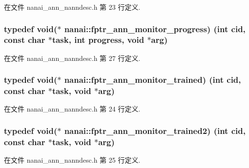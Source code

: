 在文件 nanai\+\_\+ann\+\_\+nanndesc.\+h 第 23 行定义.

\hypertarget{namespacenanai_a5c9964edbd4db8ae35df7cd024020e87}{}
\subsubsection[{fptr\+\_\+ann\+\_\+monitor\+\_\+progress}]{\setlength{\rightskip}{0pt plus 5cm}typedef void($\ast$ nanai\+::fptr\+\_\+ann\+\_\+monitor\+\_\+progress) (int cid, const char $\ast$task, int progress, void $\ast$arg)}\label{namespacenanai_a5c9964edbd4db8ae35df7cd024020e87}


在文件 nanai\+\_\+ann\+\_\+nanndesc.\+h 第 27 行定义.

\hypertarget{namespacenanai_adb209ab120b98e800db2b0c8621cd488}{}
\subsubsection[{fptr\+\_\+ann\+\_\+monitor\+\_\+trained}]{\setlength{\rightskip}{0pt plus 5cm}typedef void($\ast$ nanai\+::fptr\+\_\+ann\+\_\+monitor\+\_\+trained) (int cid, const char $\ast$task, void $\ast$arg)}\label{namespacenanai_adb209ab120b98e800db2b0c8621cd488}


在文件 nanai\+\_\+ann\+\_\+nanndesc.\+h 第 24 行定义.

\hypertarget{namespacenanai_a598e872bf861dac8080e98d6d155b3b5}{}
\subsubsection[{fptr\+\_\+ann\+\_\+monitor\+\_\+trained2}]{\setlength{\rightskip}{0pt plus 5cm}typedef void($\ast$ nanai\+::fptr\+\_\+ann\+\_\+monitor\+\_\+trained2) (int cid, const char $\ast$task, void $\ast$arg)}\label{namespacenanai_a598e872bf861dac8080e98d6d155b3b5}


在文件 nanai\+\_\+ann\+\_\+nanndesc.\+h 第 25 行定义.

